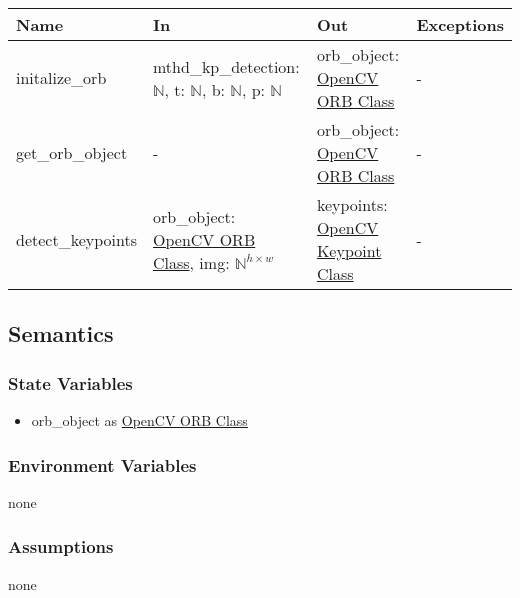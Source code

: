 \documentclass[12pt, titlepage]{article}
\begin{document}
\begin{center}
\begin{tabular}{p{4cm} p{4.5cm} p{4cm} p{2cm}}
\hline
\textbf{Name} & \textbf{In} & \textbf{Out} & \textbf{Exceptions} \\
\hline
initalize\_orb 
& mthd\_kp\_detection: $\mathbb{N}$,\newline
t: $\mathbb{N}$, \newline
b: $\mathbb{N}$, \newline
p: $\mathbb{N}$
& orb\_object: \href{https://docs.opencv.org/3.4/db/d95/classcv_1_1ORB.html}{OpenCV ORB Class}
& - \\
\hline
get\_orb\_object 
& -
& orb\_object: \href{https://docs.opencv.org/3.4/db/d95/classcv_1_1ORB.html}{OpenCV ORB Class}
& - \\
\hline
detect\_keypoints 
& orb\_object: \href{https://docs.opencv.org/3.4/db/d95/classcv_1_1ORB.html}{OpenCV ORB Class}, \newline
img: $\mathbb{N}^{h \times w}$
& keypoints: \href{https://docs.opencv.org/3.4/d2/d29/classcv_1_1KeyPoint.html}{OpenCV Keypoint Class}
& - \\
\hline
\end{tabular}
\end{center}

\subsection{Semantics}

\subsubsection{State Variables}
\begin{itemize}
  \item orb\_object as \href{https://docs.opencv.org/3.4/db/d95/classcv_1_1ORB.html}{OpenCV ORB Class}
\end{itemize}

\subsubsection{Environment Variables}
none

\subsubsection{Assumptions}
none
\end{document}
